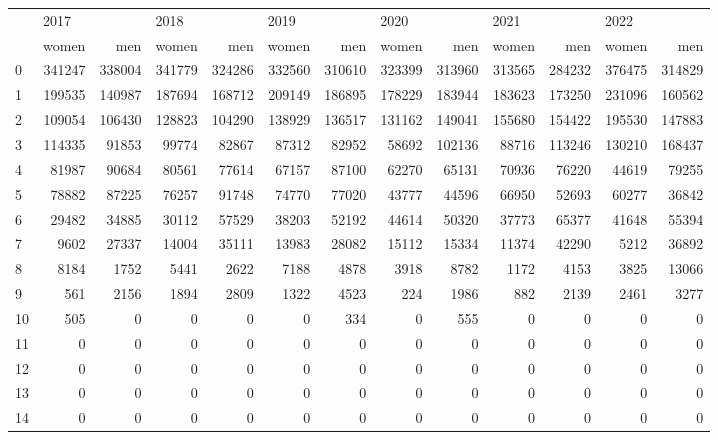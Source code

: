 \begin{tabular}{lrrrrrrrrrrrr}
\toprule
{} & \multicolumn{2}{l}{2017} & \multicolumn{2}{l}{2018} & \multicolumn{2}{l}{2019} & \multicolumn{2}{l}{2020} & \multicolumn{2}{l}{2021} & \multicolumn{2}{l}{2022} \\
{} &   women &     men &   women &     men &   women &     men &   women &     men &   women &     men &   women &     men \\
\midrule
0  &  341247 &  338004 &  341779 &  324286 &  332560 &  310610 &  323399 &  313960 &  313565 &  284232 &  376475 &  314829 \\
1  &  199535 &  140987 &  187694 &  168712 &  209149 &  186895 &  178229 &  183944 &  183623 &  173250 &  231096 &  160562 \\
2  &  109054 &  106430 &  128823 &  104290 &  138929 &  136517 &  131162 &  149041 &  155680 &  154422 &  195530 &  147883 \\
3  &  114335 &   91853 &   99774 &   82867 &   87312 &   82952 &   58692 &  102136 &   88716 &  113246 &  130210 &  168437 \\
4  &   81987 &   90684 &   80561 &   77614 &   67157 &   87100 &   62270 &   65131 &   70936 &   76220 &   44619 &   79255 \\
5  &   78882 &   87225 &   76257 &   91748 &   74770 &   77020 &   43777 &   44596 &   66950 &   52693 &   60277 &   36842 \\
6  &   29482 &   34885 &   30112 &   57529 &   38203 &   52192 &   44614 &   50320 &   37773 &   65377 &   41648 &   55394 \\
7  &    9602 &   27337 &   14004 &   35111 &   13983 &   28082 &   15112 &   15334 &   11374 &   42290 &    5212 &   36892 \\
8  &    8184 &    1752 &    5441 &    2622 &    7188 &    4878 &    3918 &    8782 &    1172 &    4153 &    3825 &   13066 \\
9  &     561 &    2156 &    1894 &    2809 &    1322 &    4523 &     224 &    1986 &     882 &    2139 &    2461 &    3277 \\
10 &     505 &       0 &       0 &       0 &       0 &     334 &       0 &     555 &       0 &       0 &       0 &       0 \\
11 &       0 &       0 &       0 &       0 &       0 &       0 &       0 &       0 &       0 &       0 &       0 &       0 \\
12 &       0 &       0 &       0 &       0 &       0 &       0 &       0 &       0 &       0 &       0 &       0 &       0 \\
13 &       0 &       0 &       0 &       0 &       0 &       0 &       0 &       0 &       0 &       0 &       0 &       0 \\
14 &       0 &       0 &       0 &       0 &       0 &       0 &       0 &       0 &       0 &       0 &       0 &       0 \\
\bottomrule
\end{tabular}
